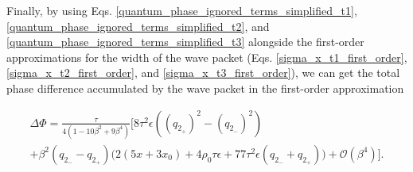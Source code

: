 \documentclass{article}
\begin{document}
Finally, by using Eqs. \ref{quantum_phase_ignored_terms_simplified_t1}, \ref{quantum_phase_ignored_terms_simplified_t2}, and \ref{quantum_phase_ignored_terms_simplified_t3} alongside the first-order approximations for the width of the wave packet (Eqs. \ref{sigma_x_t1_first_order}, \ref{sigma_x_t2_first_order}, and \ref{sigma_x_t3_first_order}), we can get the total phase difference accumulated by the wave packet in the first-order approximation

\begin{multline}
\Delta \Phi = \frac{\tau }{4 \left(1 -10 \beta ^2 + 9 \beta ^4\right)} 
\Bigg[ 8 \tau ^2 \epsilon \text{} \left( \text{$(q_{2_{+}})$}^2- \text{$(q_{2_{-}})$}^2\right) \\
+ \beta ^2 (\text{$q_{2_{-}}$}-\text{$q_{2_{+}}$}) \bigg(2 \left(5 x+3 x_0\right) +4 \rho _0 \tau  \epsilon + 77\tau ^2 \epsilon  \text{} (\text{$q_{2_{-}}$}+\text{$q_{2_{+}}$})\bigg) 
+ \mathcal{O}(\beta ^4) \Bigg].
\end{multline}
\end{document}
